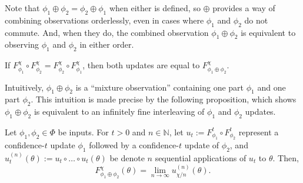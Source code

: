 Note that $\phi_1 \oplus \phi_2 = \phi_2 \oplus \phi_1$ when either is
defined, so $\oplus$ provides a way of combining observations
orderlessly, even in cases where $\phi_1$ and $\phi_2$ do not commute.
And, when they do, the combined observation $\phi_1\oplus \phi_2$
is equivalent to observing $\phi_1$ and $\phi_2$ in either order.

\begin{prop}
	If $F^{\chi}_{\phi_1} \circ F^{\chi}_{\phi_2} =
	 	F^{\chi}_{\phi_2} \circ F^{\chi}_{\phi_1}$,
	then both updates are equal to
	 $F^{\chi}_{\phi_1 \oplus \phi_2}$. %
\end{prop}

Intuitively, $\phi_1 \oplus \phi_2$ is a ``mixture observation'' containing
one part $\phi_1$ and one part $\phi_2$. This intuition is made
precise by the following proposition,
which shows $\phi_1\oplus\phi_2$ is equivalent to an infinitely
fine interleaving of $\phi_1$ and $\phi_2$ updates.

\begin{prop}
	Let $\phi_1, \phi_2 \in \Phi$ be inputs.
	For $t > 0$ and $n \in \mathbb N$, let
	$u_t := F_{\phi_1}^t \circ F_{\phi_2}^t
	$
 	represent
	a confidence-$t$ update $\phi_1$ followed
	by a confidence-$t$ update of $\phi_2$,
	and
	$u_t^{(n)}(\theta) := u_t \circ\ldots\circ u_t(\theta)$
	be denote $n$ sequential applications of $u_t$ to $\theta$.
	Then,
	\[
		F_{\phi_1 \oplus \phi_2}^\chi(\theta) =
			\lim_{n \to \infty} u_{\chi/n}^{(n)}(\theta)
		.
	\]
\end{prop}


